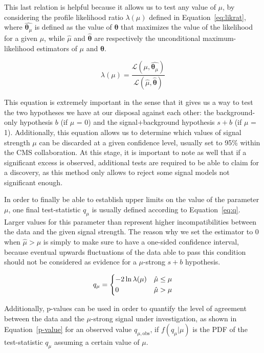 \documentclass[a4paper, 10pt, openright]{report}
\begin{document}
This last relation is helpful because it allows us to test any value of $\mu$, by considering the profile likelihood ratio $\lambda(\mu)$ defined in Equation~\ref{eq:likrat}, where $\hat{\bm \theta_\mu}$ is defined as the value of $\bm \theta$ that maximizes the value of the likelihood for a given $\mu$, while $\hat{\mu}$ and $\hat{\bm \theta}$ are respectively the unconditional maximum-likelihood estimators of $\mu$ and $\bm \theta$.

\begin{equation}
\label{eq:likrat}
\lambda(\mu) = \frac{\mathcal{L}(\mu, \hat{\bm \theta_\mu})}{\mathcal{L}(\hat{\mu}, \hat{\bm \theta})} 
\end{equation}

This equation is extremely important in the sense that it gives us a way to test the two hypotheses we have at our disposal against each other: the background-only hypothesis $b$ (if $\mu$ = 0) and the signal+background hypothesis $s + b$ (if $\mu$ = 1). Additionally, this equation allows us to determine which values of signal strength $\mu$ can be discarded at a given confidence level, usually set to 95\% within the \ac{CMS} collaboration. At this stage, it is important to note as well that if a significant excess is observed, additional tests are required to be able to claim for a discovery, as this method only allows to reject some signal models not significant enough.

In order to finally be able to establish upper limits on the value of the parameter $\mu$, one final test-statistic $q_\mu$ is usually defined according to Equation~\ref{eq:q}. Larger values for this parameter than represent higher incompatibilities between the data and the given signal strength. The reason why we set the estimator to 0 when $\hat{\mu} > \mu$ is simply to make sure to have a one-sided confidence interval, because eventual upwards fluctuations of the data able to pass this condition should not be considered as evidence for a $\mu$-strong $s+b$ hypothesis.

\begin{equation}
\label{eq:q}
q_\mu = 
\begin{dcases}
-2 \ln \lambda(\mu) & \hat{\mu} \leq \mu \\
0 & \hat{\mu} > \mu
\end{dcases}
\end{equation}

Additionally, p-values can be used in order to quantify the level of agreement between the data and the $\mu$-strong signal under investigation, as shown in Equation~\ref{p-value} for an observed value $q_{\mu, \text{obs}}$, if $f(q_\mu|\mu)$ is the \ac{PDF} of the test-statistic $q_\mu$ assuming a certain value of $\mu$.
\end{document}
